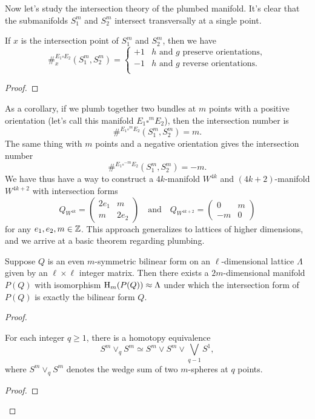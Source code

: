 Now let's study the intersection theory of the plumbed manifold. It's clear that the submanifolds $S_1^m$ and $S_2^m$ intersect transversally at a single point.

\begin{proposition}
	If $x$ is the intersection point of $S_1^m$ and $S_2^m$, then we have
	\[
		\#^{E_1\square E_2}_{x}(S_1^m, S_2^m) = \begin{cases}
			+1 & h \textrm{ and }g\textrm{ preserve orientations}, \\
			-1 & h \textrm{ and }g\textrm{ reverse orientations}.  \\
		\end{cases}
	\]
\end{proposition}
\begin{proof}
\end{proof}

As a corollary, if we plumb together two bundles at $m$ points with a positive orientation (let's call this manifold $E_1\square^m E_2$), then the intersection number is \[\#^{E_1\square^m E_2}(S^m_1, S^m_2)=m.\] The same thing with $m$ points and a negative orientation gives the intersection number \[\#^{E_1\square^{-m} E_2}(S^m_1,S^m_2)=-m.\]
We have thus have a way to construct a $4k$-manifold $W^{4k}$ and $(4k+2)$-manifold $W^{4k+2}$ with intersection forms
\[
	Q_{W^{4k}} = \begin{pmatrix} 2e_1 & m \\ m & 2e_2\end{pmatrix}
	\quad\textrm{and}\quad
	Q_{W^{4k+2}} = \begin{pmatrix} 0 & m \\ -m & 0\end{pmatrix}
\]
for any $e_1, e_2,m\in \mathbb{Z}$. This approach generalizes to lattices of higher dimensions, and we arrive at a basic theorem regarding plumbing.

\begin{theorem}
	Suppose $Q$ is an even $m$-symmetric bilinear form on an $\ell$-dimensional lattice $\Lambda$ given by an $\ell\times \ell$ integer matrix. Then there exists a $2m$-dimensional manifold $P(Q)$ with isomorphism $\operatorname{H}_{m}(P(Q))\approx \Lambda$ under which the intersection form of $P(Q)$ is exactly the bilinear form $Q$.
\end{theorem}

\begin{proof}

	\begin{lemma}
		For each integer $q\geq 1$, there is a homotopy equivalence
		\[
			S^m\vee_q S^m \simeq S^m\vee S^m \vee \bigvee_{q-1} S^1,
		\]
		where $S^m\vee_q S^m$ denotes the wedge sum of two $m$-spheres at $q$ points.
	\end{lemma}

	\begin{proof}
	\end{proof}

\end{proof}

